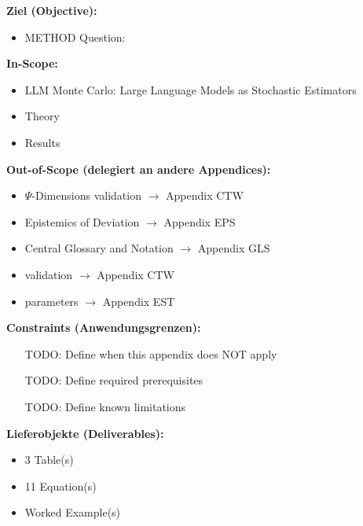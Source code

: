 

%
\begin{tcolorbox}[
    colback=orange!5!white,
    colframe=orange!75!black,
    title={\textbf{Appendix Scope: Ziel / In-Scope / Out-of-Scope / Constraints}},
    fonttitle=\bfseries
]

\textbf{Ziel (Objective):}
\begin{itemize}[nosep]
    \item METHOD Question:
\end{itemize}

\textbf{In-Scope:}
\begin{itemize}[nosep]
    \item LLM Monte Carlo: Large Language Models as Stochastic Estimators
    \item Theory
    \item Results
\end{itemize}

\textbf{Out-of-Scope (delegiert an andere Appendices):}
\begin{itemize}[nosep]
    \item $\Psi$-Dimensions validation $\rightarrow$ Appendix CTW
    \item Epistemics of Deviation $\rightarrow$ Appendix EPS
    \item Central Glossary and Notation $\rightarrow$ Appendix GLS
    \item validation $\rightarrow$ Appendix CTW
    \item parameters $\rightarrow$ Appendix EST
\end{itemize}

\textbf{Constraints (Anwendungsgrenzen):}
\begin{itemize}[nosep]
    \item [TODO: Define when this appendix does NOT apply]
    \item [TODO: Define required prerequisites]
    \item [TODO: Define known limitations]
\end{itemize}

\textbf{Lieferobjekte (Deliverables):}
\begin{itemize}[nosep]
    \item 3 Table(s)
    \item 11 Equation(s)
    \item Worked Example(s)
\end{itemize}

\end{tcolorbox}


